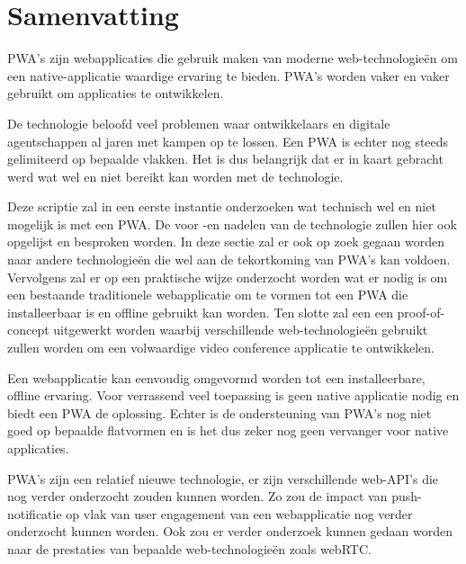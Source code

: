 





\chapter*{Samenvatting}

PWA's zijn webapplicaties die gebruik maken van moderne web-technologieën om een native-applicatie waardige ervaring te bieden. PWA's worden  vaker en vaker gebruikt om applicaties te ontwikkelen.

De technologie beloofd veel problemen waar ontwikkelaars en digitale agentschappen al jaren met kampen op te lossen.  Een PWA is echter nog steeds gelimiteerd op bepaalde vlakken. 
Het is dus belangrijk dat er in kaart gebracht werd wat wel en niet bereikt kan worden met de technologie.

Deze scriptie zal in een eerste instantie onderzoeken wat technisch wel en niet mogelijk is met een PWA. De voor -en nadelen van de technologie zullen hier ook opgelijst en besproken worden.
In deze sectie zal er ook op zoek gegaan worden naar andere technologieën die wel aan de tekortkoming van PWA's kan voldoen.
Vervolgens zal er op een praktische wijze onderzocht worden wat er nodig is om een bestaande traditionele webapplicatie om te vormen tot een PWA die installeerbaar is en offline gebruikt kan worden.
Ten slotte zal een een proof-of-concept uitgewerkt worden waarbij verschillende web-technologieën gebruikt zullen worden om een volwaardige video conference applicatie te ontwikkelen. 

Een webapplicatie kan eenvoudig omgevormd worden tot een installeerbare, offline ervaring. Voor verrassend veel toepassing is geen native applicatie nodig en biedt een PWA de oplossing.
Echter is de ondersteuning van PWA's nog niet goed op bepaalde flatvormen en is het dus zeker nog geen vervanger voor native applicaties.

PWA's zijn een relatief nieuwe technologie, er zijn verschillende web-API's die nog verder onderzocht zouden kunnen worden. Zo zou de impact van push-notificatie op vlak van user engagement van een webapplicatie nog verder onderzocht kunnen worden. Ook zou er verder onderzoek kunnen gedaan worden naar de prestaties van bepaalde web-technologieën zoals webRTC.